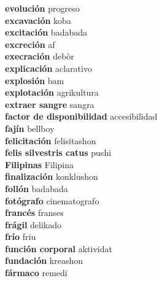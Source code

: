 \textbf{ evolución  } progreso \\
\textbf{ excavación  } koba \\
\textbf{ excitación  } badabada \\
\textbf{ excreción  } af \\
\textbf{ execración  } debòr \\
\textbf{ explicación  } aclarativo \\
\textbf{ explosión  } bam \\
\textbf{ explotación  } agrikultura \\
\textbf{ extraer sangre  } sangra \\
\textbf{ factor de disponibilidad  } accesibilidad \\
\textbf{ fajín  } bellboy \\
\textbf{ felicitación  } felisitashon \\
\textbf{ felis silvestris catus  } pushi \\
\textbf{ Filipinas  } Filipina \\
\textbf{ finalización  } konklushon \\
\textbf{ follón  } badabada \\
\textbf{ fotógrafo  } cinematografo \\
\textbf{ francés  } franses \\
\textbf{ frágil  } delikado \\
\textbf{ frío  } friu \\
\textbf{ función corporal  } aktividat \\
\textbf{ fundación  } kreashon \\
\textbf{ fármaco  } remedi \\
